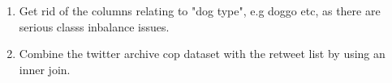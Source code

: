 \documentclass[12pt]{article}
\begin{document}
\begin{table}
	\begin{enumerate}
	\caption{List of Tidiness Issues that were fixed} \label{list2}
		\item Get rid of the columns relating to "dog type", e.g doggo etc, as there are serious classs inbalance issues.
		\item Combine the twitter archive cop dataset with the retweet list by using an inner join.
	\end{enumerate}
\end{table}
\end{document}
